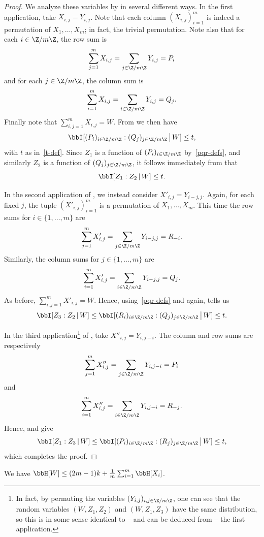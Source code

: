\begin{proof}\leanok
  We analyze these variables by  in several different ways.
  In the first application, take $X_{i,j}=Y_{i,j}$.
  Note that each column $(X_{i,j})_{i=1}^m$ is indeed a permutation of $X_1,\dots,X_m$; in fact, the trivial permutation.
  Note also that for each $i \in \Z/m\Z$, the row sum is
  \[
    \sum_{j=1}^m X_{i,j} = \sum_{j \in \Z/m\Z} Y_{i,j} = P_i
  \]
  and for each $j \in \Z/m\Z$, the column sum is
  \[
    \sum_{i=1}^m X_{i,j} = \sum_{i \in \Z/m\Z} Y_{i,j} = Q_j.
  \]
  Finally note that $\sum_{i,j=1}^m X_{i,j} = W$.
  From  we then have
  \[
    \bbI[ (P_i)_{i \in \Z/m\Z} : (Q_j)_{j \in \Z/m\Z } \,\big|\, W ] \leq t,
  \]
  with $t$ as in~\eqref{t-def}.
  Since $Z_1$ is a function of $(P_i)_{i \in \Z/m\Z}$ by~\eqref{pqr-defs}, and similarly $Z_2$ is a function of $(Q_j)_{j \in \Z/m\Z}$, it follows immediately from  that
  \[
    \bbI[ Z_1 : Z_2 \,|\, W ] \leq t.
  \]

  In the second application of , we instead consider $X'_{i,j} = Y_{i-j,j}$.
  Again, for each fixed $j$, the tuple $(X'_{i,j})_{i=1}^m$ is a permutation of $X_1,\dots,X_m$.
  This time the row sums for $i \in \{1,\dots, m\}$ are
  \[
    \sum_{j=1}^m X'_{i,j} = \sum_{j \in \Z/m\Z} Y_{i-j,j} = R_{-i}.
  \]
 Similarly, the column sums for $j \in \{1,\dots, m\}$ are
  \[
    \sum_{i=1}^m X'_{i,j} = \sum_{i \in \Z/m\Z} Y_{i-j,j} = Q_j.
  \]
  As before, $\sum_{i,j=1}^m X'_{i,j} = W$.
  Hence, using~\eqref{pqr-defs} and  again,  tells us
  \[
    \bbI[ Z_3 :  Z_2 \,|\, W] \leq \bbI[ (R_i)_{i \in \Z/m\Z} : (Q_j)_{j \in \Z/m\Z } \,\big|\, W ] \leq t.
  \]

  In the third application\footnote{In fact, by permuting the variables $(Y_{i,j})_{i,j \in \Z/m\Z}$, one can see that the random variables $(W, Z_1, Z_2)$ and $(W, Z_1, Z_3)$ have the same distribution, so this is in some sense identical to -- and can be deduced from -- the first application.} of , take $X''_{i,j} = Y_{i,j-i}$.
  The column and row sums are respectively
  \[
    \sum_{j=1}^m X''_{i,j} = \sum_{j \in \Z/m\Z} Y_{i,j-i} = P_i \] and
\[     \sum_{i=1}^m X''_{i,j} = \sum_{i \in \Z/m\Z} Y_{i,j-i} = R_{-j}.
  \]
  Hence,  and  give
  \[
    \bbI[ Z_1 : Z_3 \,|\, W] \leq \bbI[ (P_i)_{i \in \Z/m\Z} : (R_j)_{j \in \Z/m\Z } \,\big|\, W ] \leq t,
  \]
  which completes the proof.
\end{proof}

\begin{lemma}[Entropy of $W$]\label{ent-w}\leanok  We have $\bbH[W] \leq (2m-1)k + \frac1m \sum_{i=1}^m \bbH[X_i]$.
\end{lemma}

